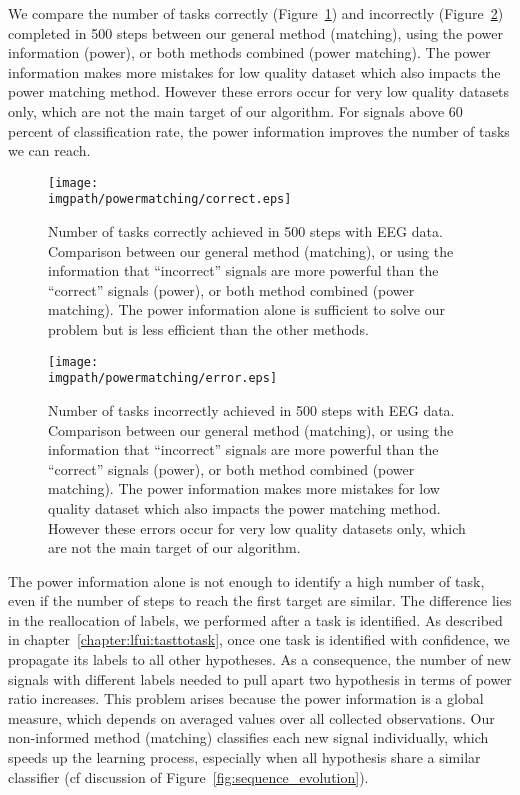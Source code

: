 We compare the number of tasks correctly (Figure~\ref{fig:nCorrect_powermatching}) and incorrectly (Figure~\ref{fig:nWrongEEG_powermatching}) completed in 500 steps between our general method (matching), using the power information (power), or both methods combined (power matching). The power information makes more mistakes for low quality dataset which also impacts the power matching method. However these errors occur for very low quality datasets only, which are not the main target of our algorithm. For signals above 60 percent of classification rate, the power information improves the number of tasks we can reach. 

\begin{figure}[!htbp]
\centering
\texttt{[image: \\imgpath/powermatching/correct.eps]}
\caption{Number of tasks correctly achieved in 500 steps with EEG data. Comparison between our general method (matching), or using the information that ``incorrect'' signals are more powerful than the ``correct'' signals (power), or both method combined (power matching). The power information alone is sufficient to solve our problem but is less efficient than the other methods.}
\label{fig:nCorrect_powermatching}
\end{figure} 

\begin{figure}[!htbp]
\centering
\texttt{[image: \\imgpath/powermatching/error.eps]}
\caption{Number of tasks incorrectly achieved in 500 steps with EEG data. Comparison between our general method (matching), or using the information that ``incorrect'' signals are more powerful than the ``correct'' signals (power), or both method combined (power matching). The power information makes more mistakes for low quality dataset which also impacts the power matching method. However these errors occur for very low quality datasets only, which are not the main target of our algorithm.}
\label{fig:nWrongEEG_powermatching}
\end{figure} 

The power information alone is not enough to identify a high number of task, even if the number of steps to reach the first target are similar. The difference lies in the reallocation of labels, we performed after a task is identified. As described in chapter~\ref{chapter:lfui:tasttotask}, once one task is identified with confidence, we propagate its labels to all other hypotheses. As a consequence, the number of new signals with different labels needed to pull apart two hypothesis in terms of power ratio increases. This problem arises because the power information is a global measure, which depends on averaged values over all collected observations. Our non-informed method (matching) classifies each new signal individually, which speeds up the learning process, especially when all hypothesis share a similar classifier (cf discussion of Figure~\ref{fig:sequence_evolution}).

